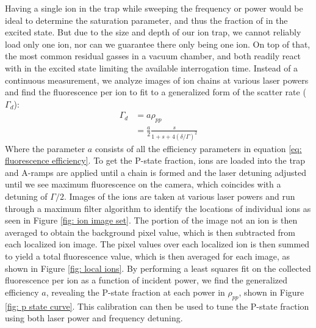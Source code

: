 Having a single ion in the trap while sweeping the frequency or power would be ideal to determine the saturation parameter, and thus the fraction of  in the excited  state. But due to the size and depth of our ion trap, we cannot reliably load only one ion, nor can we guarantee there only being one ion. On top of that, the most common residual gasses in a vacuum chamber,  and  both readily react with  in the excited state limiting the available interrogation time. Instead of a continuous measurement, we analyze images of ion chains at various laser powers and find the fluorescence per ion to fit to a generalized form of the scatter rate ($\Gamma_d$):
\begin{align}
	\Gamma_d & = a \rho_{pp} \nonumber \\
	& = \frac{a}{2}\frac{s}{1+s+4(\delta/\Gamma)^2} \label{eq: fluor fit}
\end{align}
Where the parameter $a$ consists of all the efficiency parameters in equation \ref{eq: fluorescence efficiency}. To get the P-state fraction,  ions are loaded into the trap and A-ramps are applied until a chain is formed and the laser detuning adjusted until we see maximum fluorescence on the camera, which coincides with a detuning of $\Gamma/2$. Images of the ions are taken at various laser powers and run through a maximum filter algorithm to identify the locations of individual  ions as seen in Figure \ref{fig: ion image set}. The portion of the image not an ion is then averaged to obtain the background pixel value, which is then subtracted from each localized ion image. The pixel values over each localized ion is then summed to yield a total fluorescence value, which is then averaged for each image, as shown in Figure \ref{fig: local ions}. By performing a least squares fit on the collected fluorescence per ion as a function of incident power, we find the generalized efficiency $a$, revealing the P-state fraction at each power in $\rho_{pp}$, shown in Figure \ref{fig: p state curve}. This calibration can then be used to tune the P-state fraction using both laser power and frequency detuning.

